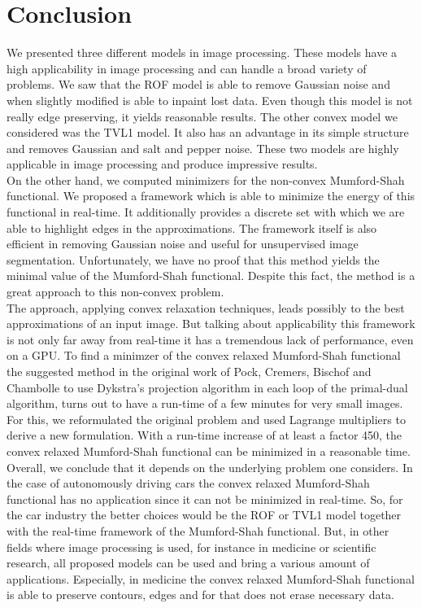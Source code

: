 \documentclass[abstracton]{scrreprt}
\begin{document}
\chapter{Conclusion} %
\label{cha:conclusion}
    We presented three different models in image processing. These models have a high applicability in image processing and can handle a broad variety of problems. We saw that the ROF model is able to remove Gaussian noise and when slightly modified is able to inpaint lost data. Even though this model is not really edge preserving, it yields reasonable results. The other convex model we considered was the TVL1 model. It also has an advantage in its simple structure and removes Gaussian and salt and pepper noise. These two models are highly applicable in image processing and produce impressive results.\\
    On the other hand, we computed minimizers for the non-convex Mumford-Shah functional. We proposed a framework which is able to minimize the energy of this functional in real-time. It additionally provides a discrete set with which we are able to highlight edges in the approximations. The framework itself is also efficient in removing Gaussian noise and useful for unsupervised image segmentation. Unfortunately, we have no proof that this method yields the minimal value of the Mumford-Shah functional. Despite this fact, the method is a great approach to this non-convex problem.\\
    The approach, applying convex relaxation techniques, leads possibly to the best approximations of an input image. But talking about applicability this framework is not only far away from real-time it has a tremendous lack of performance, even on a GPU. To find a minimzer of the convex relaxed Mumford-Shah functional the suggested method in the original work of Pock, Cremers, Bischof and Chambolle to use Dykstra's projection algorithm in each loop of the primal-dual algorithm, turns out to have a run-time of a few minutes for very small images. For this, we reformulated the original problem and used Lagrange multipliers to derive a new formulation. With a run-time increase of at least a factor 450, the convex relaxed Mumford-Shah functional can be minimized in a reasonable time.\\
    Overall, we conclude that it depends on the underlying problem one considers. In the case of autonomously driving cars the convex relaxed Mumford-Shah functional has no application since it can not be minimized in real-time. So, for the car industry the better choices would be the ROF or TVL1 model together with the real-time framework of the Mumford-Shah functional. But, in other fields where image processing is used, for instance in medicine or scientific research, all proposed models can be used and bring a various amount of applications. Especially, in medicine the convex relaxed Mumford-Shah functional is able to preserve contours, edges and for that does not erase necessary data.
\end{document}
